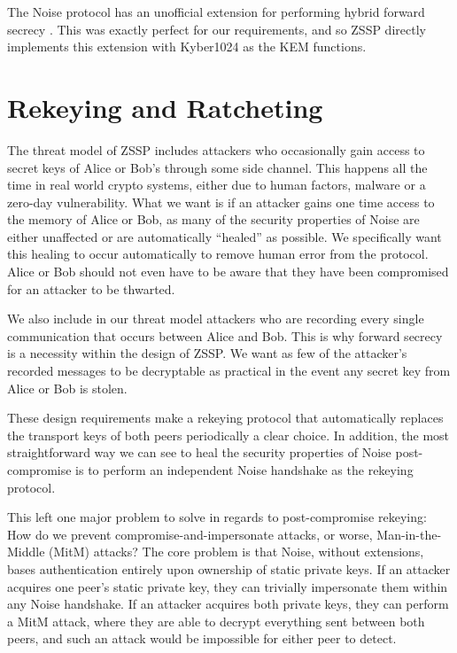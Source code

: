 \documentclass{article}
\begin{document}
The Noise protocol has an unofficial extension for performing hybrid forward secrecy \cite{noise_hfs}. This was exactly perfect for our requirements, and so ZSSP directly implements this extension with Kyber1024 as the KEM functions.

\section{Rekeying and Ratcheting}\label{sec:ratchet}

The threat model of ZSSP includes attackers who occasionally gain access to secret keys of Alice or Bob's through some side channel. This happens all the time in real world crypto systems, either due to human factors, malware or a zero-day vulnerability. What we want is if an attacker gains one time access to the memory of Alice or Bob, as many of the security properties of Noise are either unaffected or are automatically ``healed'' as possible. We specifically want this healing to occur automatically to remove human error from the protocol. Alice or Bob should not even have to be aware that they have been compromised for an attacker to be thwarted.

We also include in our threat model attackers who are recording every single communication that occurs between Alice and Bob. This is why forward secrecy is a necessity within the design of ZSSP. We want as few of the attacker's recorded messages to be decryptable as practical in the event any secret key from Alice or Bob is stolen.

These design requirements make a rekeying protocol that automatically replaces the transport keys of both peers periodically a clear choice. In addition, the most straightforward way we can see to heal the security properties of Noise post-compromise is to perform an independent Noise handshake as the rekeying protocol.

This left one major problem to solve in regards to post-compromise rekeying: How do we prevent compromise-and-impersonate attacks, or worse, Man-in-the-Middle (MitM) attacks? The core problem is that Noise, without extensions, bases authentication entirely upon ownership of static private keys. If an attacker acquires one peer's static private key, they can trivially impersonate them within any Noise handshake. If an attacker acquires both private keys, they can perform a MitM attack, where they are able to decrypt everything sent between both peers, and such an attack would be impossible for either peer to detect.
\end{document}
